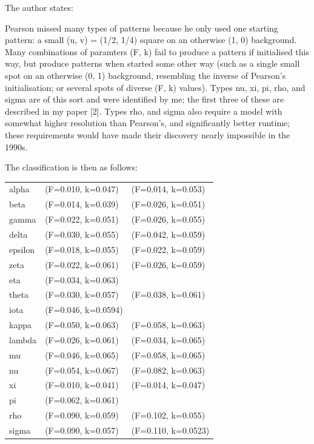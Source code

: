 The author states:
\begin{displayquote}
{\color{darkgray}
Pearson missed many types of patterns because he only used one starting pattern: 
a small (u, v) = (1/2, 1/4) square on an otherwise (1, 0) background. Many combinations of paramters (F, k) fail to produce 
a pattern if initialised this way, but produce patterns when started some other way (such as a single small spot on 
an otherwise (0, 1) background, resembling the inverse of Pearson's initialisation; or several spots of
diverse (F, k) values). Types nu, xi, pi, rho, and sigma are of this sort and were identified by me; 
the first three of these are described in my paper [2]. Types rho, and sigma also require a model with somewhat higher 
resolution than Pearson's, and significantly better runtime; these requirements would have made their discovery 
nearly impossible in the 1990s.
}
\end{displayquote} 

The classification is then as follows:
\begin{center}
\begin{tabular}{lll}
alpha   & (F=0.010, k=0.047) &(F=0.014, k=0.053) \\
beta    & (F=0.014, k=0.039) &(F=0.026, k=0.051) \\
gamma   & (F=0.022, k=0.051) &(F=0.026, k=0.055) \\
delta   & (F=0.030, k=0.055) &(F=0.042, k=0.059) \\
epsilon & (F=0.018, k=0.055) &(F=0.022, k=0.059) \\
zeta    & (F=0.022, k=0.061) &(F=0.026, k=0.059) \\
eta     & (F=0.034, k=0.063) &	\\
theta   & (F=0.030, k=0.057) &(F=0.038, k=0.061) \\
iota    & (F=0.046, k=0.0594)   \\
kappa   & (F=0.050, k=0.063) &(F=0.058, k=0.063) \\
lambda  & (F=0.026, k=0.061) &(F=0.034, k=0.065) \\
mu      & (F=0.046, k=0.065) &(F=0.058, k=0.065) \\
nu      & (F=0.054, k=0.067) &(F=0.082, k=0.063) \\
xi      & (F=0.010, k=0.041) &(F=0.014, k=0.047) \\
pi      & (F=0.062, k=0.061) \\
rho     & (F=0.090, k=0.059) &(F=0.102, k=0.055) \\
sigma   & (F=0.090, k=0.057) &(F=0.110, k=0.0523)
\end{tabular}
\end{center}






